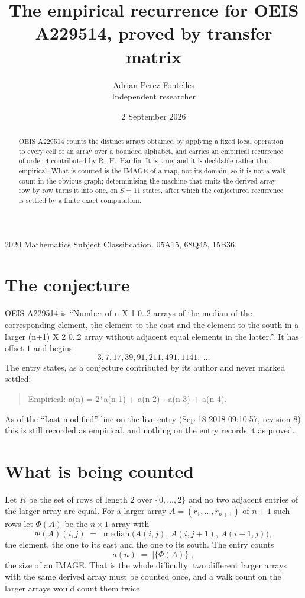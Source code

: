 \documentclass[11pt,a4paper]{article}
\title{The empirical recurrence for OEIS A229514, proved by transfer matrix}
\author{Adrian Perez Fontelles\\ \small Independent researcher}
\date{2 September 2026}
\theoremstyle{plain}
\theoremstyle{definition}
\begin{document}
\maketitle

\begin{abstract}
OEIS A229514 counts the distinct arrays obtained by applying a fixed local operation to every cell
of an array over a bounded alphabet, and carries an empirical recurrence of order $4$
contributed by R.~H.~Hardin. It is true, and it is decidable rather than empirical. What is
counted is the IMAGE of a map, not its domain, so it is not a walk count in the obvious graph;
determinising the machine that emits the derived array row by row turns it into one, on
$S=11$ states, after which the conjectured recurrence is settled by a finite exact
computation.
\end{abstract}

\noindent\small 2020 Mathematics Subject Classification. 05A15, 68Q45, 15B36.\normalsize

\section{The conjecture}

OEIS A229514 is ``Number of n X 1 0..2 arrays of the median of the corresponding element, the element to the east and the element to the south in a larger (n+1) X 2 0..2 array without adjacent equal elements in the latter.''. It has offset $1$ and begins
\[
3, 7, 17, 39, 91, 211, 491, 1141,\ \dots
\]
The entry states, as a conjecture contributed by its author and never marked settled:
\begin{quote}
Empirical: a(n) = 2*a(n-1) + a(n-2) - a(n-3) + a(n-4).
\end{quote}
As of the ``Last modified'' line on the live entry (Sep 18 2018 09:10:57, revision 8) this is still
recorded as empirical, and nothing on the entry records it as proved.

\section{What is being counted}

Let $R$ be the set of rows of length $2$ over $\{0,\dots,2\}$ and no two adjacent entries of the larger array are equal.
For a larger array $A=(r_1,\dots,r_{n+1})$ of $n+1$ such rows let $\Phi(A)$ be the
$n\times1$ array with
\[
\Phi(A)(i,j)\;=\;\operatorname{median}\bigl(A(i,j),\,A(i,j+1),\,A(i+1,j)\bigr),
\]
the element, the one to its east and the one to its south. The entry counts
\[
a(n)\;=\;\bigl|\{\Phi(A)\}\bigr| ,
\]
the size of an IMAGE. That is the whole difficulty: two different larger arrays with the same
derived array must be counted once, and a walk count on the larger arrays would count them
twice.
\end{document}
